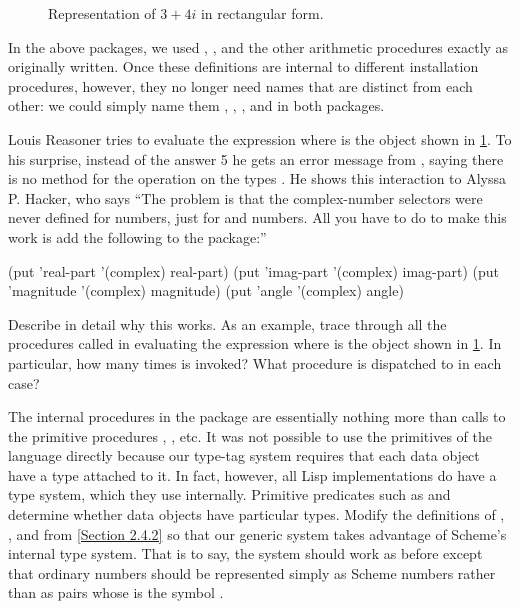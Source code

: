 \begin{figure}[tb]
	\centering
	
	\caption{Representation of \( 3 + 4i \) in rectangular form.}
	\label{Figure 2.24}
\end{figure}

In the above packages, we used , , and the other arithmetic procedures exactly as originally written.
Once these definitions are internal to different installation procedures, however, they no longer need names that are distinct from each other:
we could simply name them , , , and  in both packages.



\begin{exercise}
	\label{Exercise 2.77}
	Louis Reasoner tries to evaluate the expression  where  is the object shown in \cref{Figure 2.24}.
	To his surprise, instead of the answer 5 he gets an error message from , saying there is no method for the operation  on the types .
	He shows this interaction to Alyssa P.
	Hacker, who says “The problem is that the complex-number selectors were never defined for  numbers, just for  and  numbers.
	All you have to do to make this work is add the following to the  package:”
	\begin{scheme}
	  (put 'real-part '(complex) real-part)
	  (put 'imag-part '(complex) imag-part)
	  (put 'magnitude '(complex) magnitude)
	  (put 'angle '(complex) angle)
	\end{scheme}
	Describe in detail why this works.
	As an example, trace through all the procedures called in evaluating the expression  where  is the object shown in \cref{Figure 2.24}.
	In particular, how many times is  invoked?
	What procedure is dispatched to in each case?
\end{exercise}



\begin{exercise}
	\label{Exercise 2.78}
	The internal procedures in the  package are essentially nothing more than calls to the primitive procedures \code{+}, \code{-}, etc.
	It was not possible to use the primitives of the language directly because our type-tag system requires that each data object have a type attached to it.
	In fact, however, all Lisp implementations do have a type system, which they use internally.
	Primitive predicates such as  and   determine whether data objects have particular types.
	Modify the definitions of , , and  from \cref{Section 2.4.2} so that our generic system takes advantage of Scheme’s internal type system.
	That is to say, the system should work as before except that ordinary numbers should be represented simply as Scheme numbers rather than as pairs whose  is the symbol .
\end{exercise}



